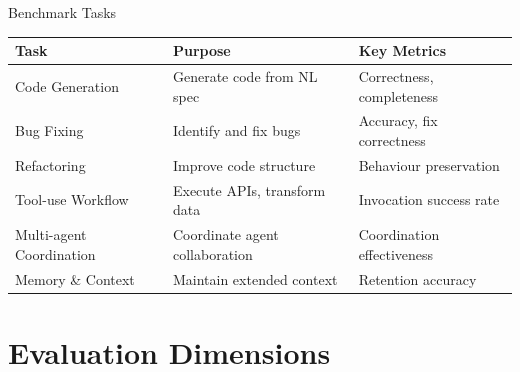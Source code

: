 \documentclass[aspectratio=169]{beamer}
\begin{document}
\begin{frame}{Benchmark Tasks}
    \begin{table}
        \centering
        \footnotesize
        \begin{tabular}{lp{5cm}p{4cm}}
            \toprule
            \textbf{Task}            & \textbf{Purpose}               & \textbf{Key Metrics}       \\
            \midrule
            Code Generation          & Generate code from NL spec     & Correctness, completeness  \\
            Bug Fixing               & Identify and fix bugs          & Accuracy, fix correctness  \\
            Refactoring              & Improve code structure         & Behaviour preservation     \\
            Tool-use Workflow        & Execute APIs, transform data   & Invocation success rate    \\
            Multi-agent Coordination & Coordinate agent collaboration & Coordination effectiveness \\
            Memory \& Context        & Maintain extended context      & Retention accuracy         \\
            \bottomrule
        \end{tabular}
    \end{table}
\end{frame}

\section{Evaluation Dimensions}
\end{document}
